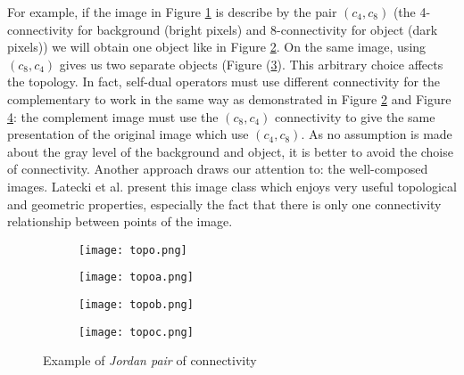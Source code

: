 \par 
For example, if the image in Figure \ref{fig:topo} is describe by the pair $(c_4,c_8)$ (the 4-connectivity for background (bright pixels) and 8-connectivity for object (dark pixels)) we will obtain one object like in Figure \ref{fig:topoa}. On the same image, using $(c_8,c_4)$ gives us two separate objects (Figure (\ref{fig:topob}). This arbitrary choice affects the topology. In fact, self-dual operators must use different connectivity for the complementary to work in the same way as demonstrated in Figure \ref{fig:topoa} and Figure \ref{fig:topoc}: the complement image must use the $(c_8,c_4)$ connectivity to give the same presentation of the original image which use $(c_4,c_8)$. As no assumption is made about the gray level of the background and object, it is better to avoid the choise of connectivity. Another approach draws our attention to: the well-composed images. Latecki et al. \cite{Latecki95} present this image class which enjoys very useful topological and geometric properties, especially the fact that there is only one connectivity relationship between points of the image.

\begin{figure}

	\begin{subfigure}[b]{0.3\textwidth}
	 	\texttt{[image: topo.png]} \caption{}\label{fig:topo} \end{subfigure}
	\begin{subfigure}[b]{0.3\textwidth}
		\texttt{[image: topoa.png]} \caption{}\label{fig:topoa} \end{subfigure}	
\centering		
		
	\begin{subfigure}[b]{0.3\textwidth}
		\texttt{[image: topob.png]} \caption{}\label{fig:topob} \end{subfigure}
	\begin{subfigure}[b]{0.3\textwidth}
		\texttt{[image: topoc.png]} \caption{}\label{fig:topoc} \end{subfigure}
	\centering
	\caption[Example of \textit{Jordan pair} of connectivity] {Example of \textit{Jordan pair} of connectivity}
	\label{fig:Jordanpair}
\end{figure}


